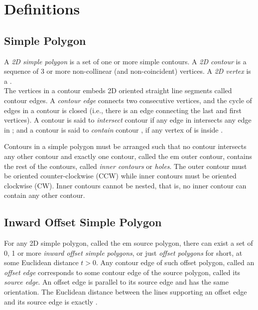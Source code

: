 
\section{Definitions}

\subsection{Simple Polygon}

A {\em 2D simple polygon} is a set of one or more simple contours. A
{\em 2D contour} is a sequence of 3 or more non-collinear (and
non-coincident) vertices. A {\em 2D vertex} is a .\\ The
vertices in a contour embeds 2D oriented straight line segments called
contour edges. A {\em contour edge} connects two consecutive vertices,
and the cycle of edges in a contour is closed (i.e., there is an edge
connecting the last and first vertices). A contour  is said to
{\em intersect} contour  if any edge in  intersects any 
edge in ; and a contour  is said to {\em contain} contour 
, if any vertex of  is inside .

Contours in a simple polygon must be arranged such that no contour
intersects any other contour and exactly one contour, called the
{em outer contour}, contains the rest of the contours, called
{\em inner contours} or {\em holes}. The outer contour must be
oriented counter-clockwise (CCW) while inner contours must be oriented
clockwise (CW). Inner contours cannot be nested, that is, no inner
contour can contain any other contour.

\subsection{Inward Offset Simple Polygon}

For any 2D simple polygon, called the {em source polygon}, there can
exist a set of 0, 1 or more {\em inward offset simple polygons}, or
just {\em offset polygons} for short, at some Euclidean distance
$t>0$. Any contour edge of such offset polygon, called an
{\em offset edge} corresponds to some contour edge of the
source polygon, called its {\em source edge}. An offset edge is
parallel to its source edge and has the same orientation. The
Euclidean distance between the lines supporting an offset
edge and its source edge is exactly .

